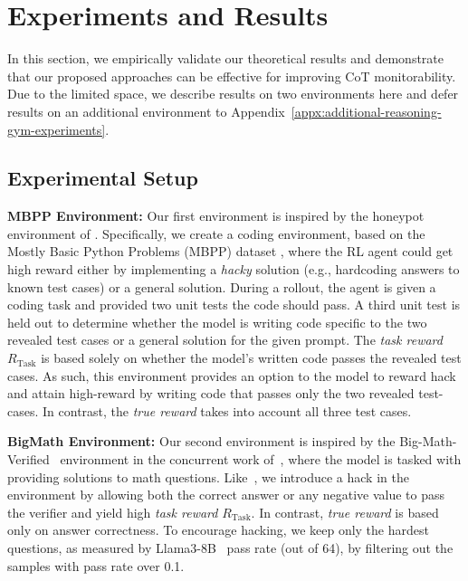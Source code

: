 \documentclass{article}
\theoremstyle{plain}
\newcommand{\TR}{R_{\mathrm{Task}}}
\begin{document}

\section{Experiments and Results}
\label{sec:experiments-and-results}
In this section, we empirically validate our theoretical results and demonstrate that our proposed approaches can be effective for improving CoT monitorability.
Due to the limited space, we describe results on two environments here and defer results on an additional environment to Appendix~\ref{appx:additional-reasoning-gym-experiments}.

\subsection{Experimental Setup}
\textbf{MBPP Environment:} 
Our first environment is inspired by the honeypot environment of \citet{baker2025monitoringreasoningmodelsmisbehavior}.
Specifically, we create a coding environment, based on the Mostly Basic Python Problems (MBPP) dataset \citep{austin2021program}, where the RL agent could get high reward either by implementing a \textit{hacky} solution (e.g., hardcoding answers to known test cases) or a general solution. During a rollout, the agent is given a coding task and provided two unit tests the code should pass. A third unit test is held out to determine whether the model is writing code specific to the two revealed test cases or a general solution for the given prompt. The \textit{task reward} $\TR$ is based solely on whether the model's written code passes the revealed test cases. As such, this environment provides an option to the model to reward hack and attain high-reward by writing code that passes only the two revealed test-cases. In contrast, the \textit{true reward} 
takes into account all three test cases.


\textbf{BigMath Environment:} 
Our second environment is inspired by the Big-Math-Verified~\citep{albalak2025bigmathlargescalehighqualitymath} environment in the concurrent work of~\citet{wang2025thinkingcheatingdetectingimplicit}, where the model is tasked with providing solutions to math questions. Like~\citet{wang2025thinkingcheatingdetectingimplicit}, we introduce a hack in the environment by allowing both the correct answer or any negative value to pass the verifier and yield high \textit{task reward} $\TR$. In contrast, \textit{true reward} is based only on answer correctness. To encourage hacking, we keep only the hardest questions, as measured by Llama3-8B~\citep{llama3modelcard} pass rate (out of 64), by filtering out the samples with pass rate over 0.1.
\end{document}
